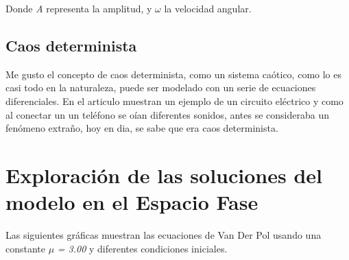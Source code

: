 \documentclass{article}
\begin{document}
 Donde \textit{A} representa la amplitud, y $\omega$ la velocidad angular.

\subsection{Caos determinista}

Me gusto el concepto de caos determinista, como un sistema caótico, como lo es casi todo en la naturaleza, puede ser modelado con un serie de ecuaciones diferenciales. En el articulo muestran un ejemplo de un circuito eléctrico y como al conectar un un teléfono se oían diferentes sonidos, antes se consideraba un fenómeno extraño, hoy en dia, se sabe que era caos determinista.  

\vspace{1cm}

\section{Exploración de las soluciones del modelo en el Espacio Fase}

Las siguientes gráficas muestran las ecuaciones de Van Der Pol usando una constante $\mu$ \textit{= 3.00} y diferentes condiciones iniciales.
\end{document}

